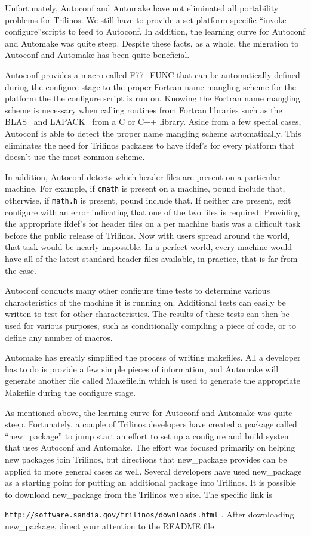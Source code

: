\documentclass[12pt,relax]{article}
\newcommand{\InlineDirectory}[1]{
  {\hspace{0.01 in}} {\tt #1} {\hspace{0.01 in}}}
\begin{document}
Unfortunately, Autoconf and Automake have not eliminated all portability 
problems for Trilinos.  We still have to provide a set platform specific
``invoke-configure''scripts to feed to Autoconf.  In addition, the learning 
curve for Autoconf and Automake was quite steep.  Despite these facts, 
as a whole, the migration to Autoconf and Automake has been quite 
beneficial.  

Autoconf provides a macro called F77\_FUNC that can be 
automatically defined during the configure stage to the proper Fortran
name mangling scheme for the platform the the configure script is run on.  
Knowing the Fortran name mangling scheme is necessary when calling routines 
from Fortran libraries such as the BLAS~\cite{BLAS1,BLAS2,BLAS3} and 
LAPACK~\cite{lapack} from a C or C++ library.  Aside from a few special cases, 
Autoconf is able to detect the proper name mangling scheme automatically.  
This eliminates the need for Trilinos packages to have ifdef's for every 
platform that doesn't use the most common scheme.

In addition, Autoconf detects which header files are present on a particular 
machine.  For example, if \InlineDirectory{cmath} is present on a machine, 
pound include that, otherwise, if \InlineDirectory{math.h} is present, pound 
include that.  If neither are present, exit configure with an error indicating 
that one of the two files is required.  Providing the appropriate ifdef's 
for header files on a per machine basis was a difficult task before the 
public release of Trilinos.  Now with users spread around the world, that 
task would be nearly impossible.  In a perfect world, every machine would 
have all of the latest standard header files available, in practice, that 
is far from the case.

Autoconf conducts many other configure time tests to determine various 
characteristics of the machine it is running on.  Additional tests can 
easily be written to test for other characteristics.  The results of these 
tests can then be used for various purposes, such as conditionally compiling 
a piece of code, or to define any number of macros.

Automake has greatly simplified the process of writing makefiles.  All a 
developer has to do is provide a few simple pieces of information, and 
Automake will generate another file called Makefile.in which is used to 
generate the appropriate Makefile during the configure stage.

As mentioned above, the learning curve for Autoconf and Automake was quite 
steep.  Fortunately, a couple of Trilinos developers have created a package 
called ``new\_package'' to jump start an effort to set up a configure and 
build system that uses Autoconf and Automake.  The effort was focused 
primarily on helping new packages join Trilinos, but directions that 
new\_package provides can be applied to more general cases as well.  Several
developers have used new\_package as a starting point for putting an additional
package into Trilinos.  It is possible to download new\_package from the 
Trilinos web site.  The specific link is 
\InlineDirectory{http://software.sandia.gov/trilinos/downloads.html}.  After
downloading new\_package, direct your attention to the README file.
\end{document}

